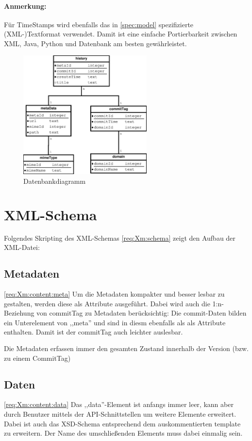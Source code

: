 \paragraph{Anmerkung:} Für TimeStamps wird ebenfalls das in \ref{spec:model} spezifizierte (XML-)Textformat
verwendet. Damit ist eine einfache Portierbarkeit zwischen XML, Java, Python und Datenbank am besten gewährleistet.

\begin{figure}[h]
	\centering
	\label{design:dia:data:db}
	\includegraphics[width=0.6\textwidth]{design/data/db.eps}
	\caption{Datenbankdiagramm}
\end{figure}

\section{XML-Schema}
Folgendes Skripting des XML-Schemas \ref{req:Xm:schema} zeigt den Aufbau der XML-Datei:

\subsection{Metadaten}
\ref{req:Xm:content:meta}
Um die Metadaten kompakter und besser lesbar zu gestalten, 
werden diese als Attribute ausgeführt. 
Dabei wird auch die 1:n-Beziehung von commitTag zu Metadaten berücksichtig:
Die commit-Daten bilden ein Unterelement von ,,meta'' und sind in diesm ebenfalls als
als Attribute enthalten.
Damit ist der commitTag auch leichter auslesbar.


Die Metadaten erfassen immer den gesamten Zustand innerhalb der Version (bzw. zu einem CommitTag)
\subsection{Daten}
\ref{req:Xm:content:data}
Das ,,data''-Element ist anfangs immer leer, kann aber durch Benutzer mittels der API-Schnittstellen 
um weitere Elemente erweitert.
Dabei ist auch das XSD-Schema entsprechend dem auskommentierten template zu erweitern.
Der Name des umschließenden Elements muss dabei einmalig sein.

